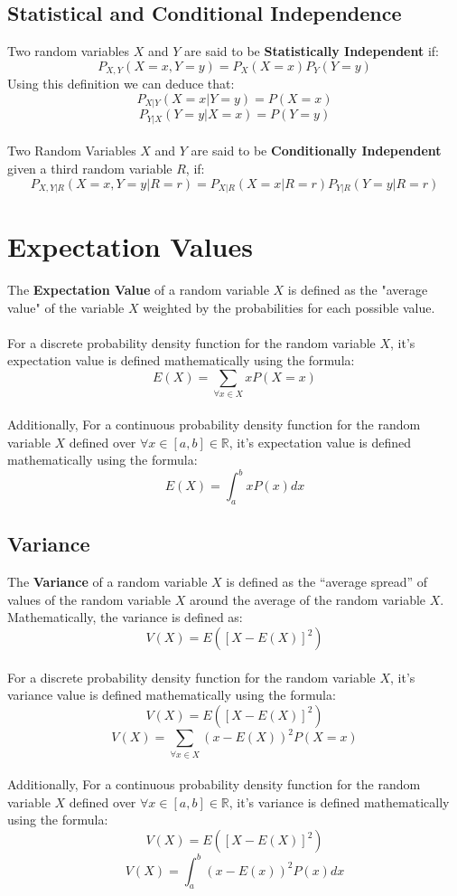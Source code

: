 \documentclass[12pt, a4paper]{book}
\begin{document}
\subsection{Statistical and Conditional Independence}
Two random variables $X$ and $Y$ are said to be \textbf{Statistically Independent} if:
$$P_{X,Y}(X=x,Y=y) = P_X(X=x)P_Y(Y=y)$$
Using this definition we can deduce that:
$$P_{X|Y}(X=x|Y=y) = P(X=x)$$
$$P_{Y|X}(Y=y|X=x) = P(Y=y)$$\\
Two Random Variables $X$ and $Y$ are said to be \textbf{Conditionally Independent} given a third random variable $R$, if:
$$P_{X,Y|R}(X=x,Y=y|R=r) = P_{X|R}(X=x|R=r)P_{Y|R}(Y=y|R=r)$$

\section{Expectation Values}
The \textbf{Expectation Value} of a random variable $X$ is defined as the "average value" of the variable $X$ weighted by the probabilities for each possible value.\\\\
For a discrete probability density function for the random variable $X$, it's expectation value is defined mathematically using the formula:
$$E(X) = \sum_{\forall x \in X}xP(X=x)$$\\
Additionally, For a continuous probability density function for the random variable $X$ defined over $\forall x \in [a,b] \in \mathbb{R}$, it's expectation value is defined mathematically using the formula:
$$E(X) = \int^{b}_{a}xP(x)dx$$

\subsection{Variance}
The \textbf{Variance} of a random variable $X$ is defined as the “average spread” of values of the random variable $X$ around the average of the random variable $X$. Mathematically, the variance is defined as:
$$V(X) = E([X - E(X)]^2)$$\\
For a discrete probability density function for the random variable $X$, it's variance value is defined mathematically using the formula:
$$V(X) = E([X - E(X)]^2)$$
$$V(X) = \sum_{\forall x \in X}(x-E(X))^2P(X=x)$$\\
Additionally, For a continuous probability density function for the random variable $X$ defined over $\forall x \in [a,b] \in \mathbb{R}$, it's variance is defined mathematically using the formula:
$$V(X) = E([X - E(X)]^2)$$
$$V(X) = \int^{b}_{a}(x-E(x))^2P(x)dx$$
\end{document}
